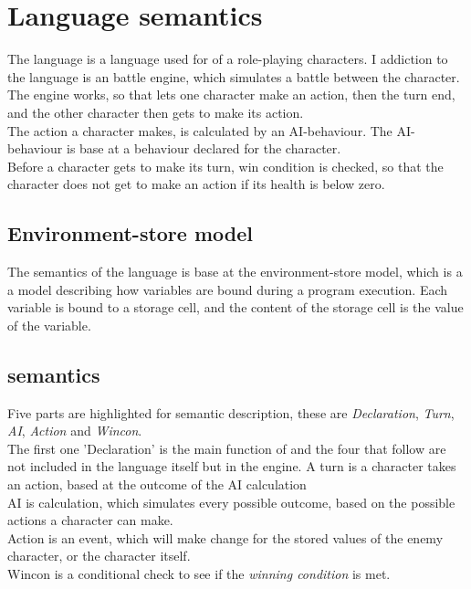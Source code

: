 \section{Language semantics}
The language is a language used for  of a role-playing characters. I addiction to the language is an battle engine, which simulates a battle between the  character. \\
The engine works, so that lets one character make an action, then the turn end, and the other character then gets to make its action. \\
The action a character makes, is calculated by an AI-behaviour. The AI-behaviour is base at a behaviour declared for the character. \\
Before a character gets to make its turn, win condition is checked, so that the character does not get to make an action if its health is below zero.  

\subsection{Environment-store model}
The semantics of the language is base at the environment-store model, which is a a model describing how variables are bound during a program execution. Each variable is bound to a storage cell, and the content of the storage cell is the value of the variable.

\subsection{\langname{} semantics}
Five parts are highlighted for semantic description, these are  \emph{Declaration}, \emph{Turn}, \emph{AI}, \emph{Action} and \emph{Wincon}.\\
The first one 'Declaration' is the main function of \langname{} and the four that follow are not included in the language itself but in the engine.
A turn is a character takes an action, based at the outcome of the AI calculation \\
AI is calculation, which simulates every possible outcome, based on the possible actions a character can make. \\
Action is an event, which will make change for the stored values of the enemy character, or the character itself.\\
Wincon is a conditional check to see if the \emph{winning condition} is met.\\\\


